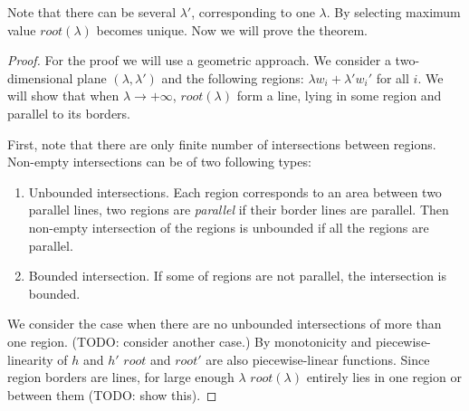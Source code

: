 Note that there can be several $\lambda'$, corresponding to one $\lambda$. By selecting maximum value $root(\lambda)$ becomes unique. Now we will prove the theorem.
\begin{proof}
	For the proof we will use a geometric approach.
	We consider a two-dimensional plane $(\lambda, \lambda')$ and the following regions: $\lambda w_i + \lambda' w_i'$ for all $i$. We will show that when $\lambda \to +\infty$, $root(\lambda)$ form a line, lying in some region and parallel to its borders.
	
	First, note that there are only finite number of intersections between regions. Non-empty intersections can be of two following types:
	\begin{enumerate}
		\item Unbounded intersections. Each region corresponds to an area between two parallel lines, two regions are \emph{parallel} if their border lines are parallel.
		Then non-empty intersection of the regions is unbounded if all the regions are parallel.
		\item Bounded intersection. If some of regions are not parallel, the intersection is bounded.
	\end{enumerate}
	We consider the case when there are no unbounded intersections of more than one region.
	(TODO: consider another case.)
	By monotonicity and piecewise-linearity of $h$ and $h'$ $root$ and $root'$ are also piecewise-linear functions. Since region borders are lines, for large enough $\lambda$ $root(\lambda)$ entirely lies in one region or between them (TODO: show this).
	

\end{proof}
